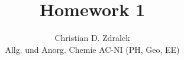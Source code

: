 \documentclass{article}
\begin{document}

\title{Homework 1} %
\author{Christian D. Zdralek\\Allg. und Anorg. Chemie AC-NI (PH, Geo, EE)} %

\maketitle

%
%
\end{document}
